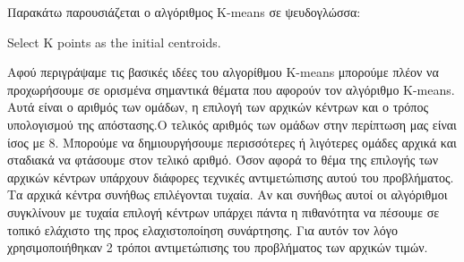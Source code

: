Παρακάτω παρουσιάζεται ο αλγόριθμος K-means σε ψευδογλώσσα:\\
\noindent\begin{minipage}{0.9\linewidth}
\centering
\begin{algorithm}[H]
    Select K points as the initial centroids.\;
\end{algorithm}
\end{minipage}

Αφού περιγράψαμε τις βασικές ιδέες του αλγορίθμου K-means μπορούμε πλέον να προχωρήσουμε σε ορισμένα σημαντικά θέματα που αφορούν τον αλγόριθμο K-means. Αυτά είναι ο αριθμός των ομάδων, η επιλογή των αρχικών κέντρων και ο τρόπος υπολογισμού της απόστασης.Ο τελικός αριθμός των ομάδων στην περίπτωση μας είναι ίσος με 8. Μπορούμε να δημιουργήσουμε περισσότερες ή λιγότερες ομάδες αρχικά και σταδιακά να φτάσουμε στον τελικό αριθμό. Όσον αφορά το θέμα της επιλογής των αρχικών κέντρων υπάρχουν διάφορες τεχνικές αντιμετώπισης αυτού του προβλήματος. Τα αρχικά κέντρα συνήθως επιλέγονται τυχαία. Αν και συνήθως αυτοί οι αλγόριθμοι συγκλίνουν με τυχαία επιλογή κέντρων υπάρχει πάντα η πιθανότητα να πέσουμε σε τοπικό ελάχιστο της προς ελαχιστοποίηση συνάρτησης. Για αυτόν τον λόγο χρησιμοποιήθηκαν 2 τρόποι αντιμετώπισης του προβλήματος των αρχικών τιμών.
